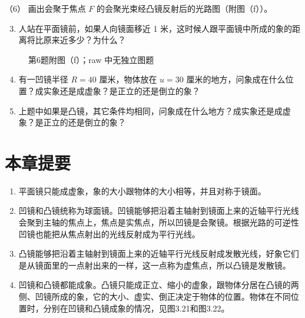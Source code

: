 （6） 画出会聚于焦点 \(F\) 的会聚光束经凸镜反射后的光路图（附图（f））。

\begin{enumerate}
\setcounter{enumi}{2}
\item
  人站在平面镜前，如果人向镜面移近 1
  米，这时候人跟平面镜中所成的象的距离将比原来近多少？为什么？
\end{enumerate}

\begin{figure}
\centering

\caption{第6题附图（f）；raw 中无独立图题}
\end{figure}

\begin{enumerate}
\setcounter{enumi}{3}
\item
  有一凹镜半径 \(R = 40\) 厘米，物体放在 \(u = 30\)
  厘米的地方，问象成在什么位置？成实象还是成虚象？是正立的还是倒立的象？
\item
  上题中如果是凸镜，其它条件均相同，问象成在什么地方？成实象还是成虚象？是正立的还是倒立的象？
\end{enumerate}

\section{本章提要}

\begin{enumerate}
\item
  平面镜只能成虚象，象的大小跟物体的大小相等，并且对称于镜面。
\item
  凹镜和凸镜统称为球面镜。凹镜能够把沿着主轴射到镜面上来的近轴平行光线会聚到主轴的焦点上，焦点是实焦点，所以凹镜是会聚镜。根据光路的可逆性凹镜也能把从焦点射出的光线反射成为平行光线。
\item
  凸镜能够把沿着主轴射到镜面上来的近轴平行光线反射成发散光线，好象它们是从镜面里的一点射出来的一样，这一点称为虚焦点，所以凸镜是发散镜。
\item
  凹镜和凸镜都能成象。凸镜只能成正立、缩小的虚象，跟物体分居在凸镜的两侧、凹镜所成的象，它的大小、虚实、倒正决定于物体的位置。物体在不同位置时，分别在凹镜和凸镜成象的情况，见图3.21和图3.22。
\end{enumerate}

